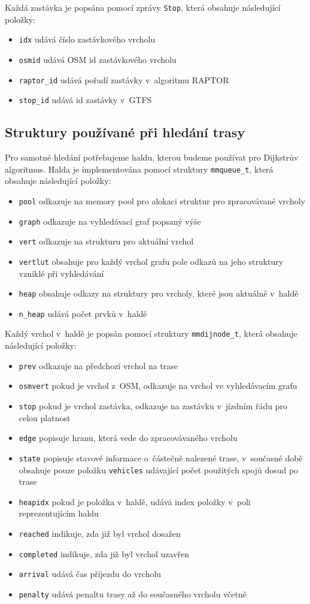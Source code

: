 Každá zastávka je popsána pomocí zprávy {\tt Stop}, která obsahuje následující
položky:
\begin{itemize}
	\item {\tt idx} udává číslo zastávkového vrcholu
	\item {\tt osmid} udává OSM id zastávkového vrcholu 
	\item {\tt raptor\_id} udává pořadí zastávky v~algoritmu RAPTOR
	\item {\tt stop\_id} udává id zastávky v~GTFS
\end{itemize} 

\subsection{Struktury používané při hledání trasy}
Pro samotné hledání potřebujeme haldu, kterou budeme používat pro Dijkstrův
algoritmus. Halda je implementována pomocí struktury {\tt mmqueue\_t}, která
obsahuje následující položky:
\begin{itemize}
	\item {\tt pool} odkazuje na memory pool pro alokaci struktur pro
		zpracovávané vrcholy 
	\item {\tt graph} odkazuje na vyhledávací graf popsaný výše
	\item {\tt vert} odkazuje na strukturu pro aktuální vrchol 
	\item {\tt vertlut} obsahuje pro každý vrchol grafu pole odkazů na
	jeho struktury vzniklé při vyhledávání
	\item {\tt heap} obsahuje odkazy na struktury pro vrcholy, které jsou
		aktuálně v~haldě
	\item {\tt n\_heap} udává počet prvků v~haldě
\end{itemize}
Každý vrchol v~haldě je popsán pomocí struktury {\tt mmdijnode\_t}, která
obsahuje následující položky:
\begin{itemize}
	\item {\tt prev} odkazuje na předchozí vrchol na trase
	\item {\tt osmvert} pokud je vrchol z~OSM, odkazuje na vrchol ve
	vyhledávacím grafu 
	\item {\tt stop} pokud je vrchol zastávka, odkazuje na zastávku
v~jízdním řádu pro celou platnost
	\item {\tt edge} popisuje hranu, která vede do zpracovávaného vrcholu 
	\item {\tt state} popisuje stavové informace o~částečně nalezené trase,
	v~současné době obsahuje pouze položku {\tt vehicles} udávající počet
	použitých spojů dosud po trase
	\item {\tt heapidx} pokud je položka v~haldě, udává index položky v~poli
	reprezentujícím haldu
	\item {\tt reached} indikuje, zda již byl vrchol dosažen
	\item {\tt completed} indikuje, zda již byl vrchol uzavřen
	\item {\tt arrival} udává čas příjezdu do vrcholu
	\item {\tt penalty} udává penaltu trasy až do současného vrcholu včetně
\end{itemize}
